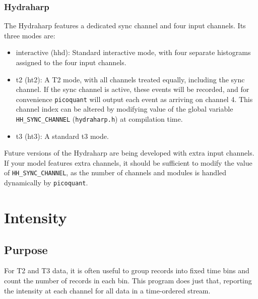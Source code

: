 \documentclass{article}
\newcommand{\picoquant}{\texttt{picoquant}}
\begin{document}
\subsubsection{Hydraharp}
The Hydraharp features a dedicated sync channel and four input channels. Its three modes are:
\begin{itemize}
\item interactive (hhd): Standard interactive mode, with four separate histograms assigned to  the four input channels.
\item t2 (ht2): A T2 mode, with all channels treated equally, including the sync channel. If the sync channel is active, these events will be recorded, and for convenience \picoquant{} will output each event as arriving on channel 4. This channel index can be altered by modifying value of the global variable \texttt{HH\_SYNC\_CHANNEL} (\texttt{hydraharp.h}) at compilation time. 
\item t3 (ht3): A standard t3 mode.
\end{itemize}
Future versions of the Hydraharp are being developed with extra input channels. If your model features extra channels, it should be sufficient to modify the value of \texttt{HH\_SYNC\_CHANNEL}, as the number of channels and modules is handled dynamically by \picoquant.

\section{Intensity}
\subsection{Purpose}
For T2 and T3 data, it is often useful to group records into fixed time bins and count the number of records in each bin. This program does just that, reporting the intensity at each channel for all data in a time-ordered stream. 
\end{document}
